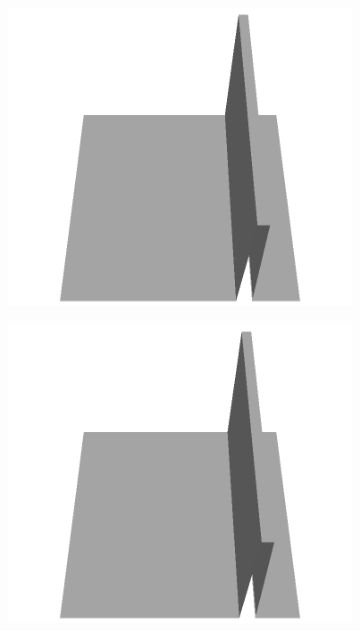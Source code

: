 \documentclass[../document.tex]{subfiles}
\begin{document}
\begin{figure}[H]
\begin{subfigure}[b]{0.065\textwidth}
    \includegraphics[width=\linewidth]{../img/5/custom_patches/walls_front/all/31-3d.png}
    \end{subfigure}
    \begin{subfigure}[b]{0.065\textwidth}
    \includegraphics[width=\linewidth]{../img/5/custom_patches/walls_front/all/30-3d.png}
    \end{subfigure}
    \begin{subfigure}[b]{0.065\textwidth}

\end{subfigure}
\end{figure}
\end{document}
